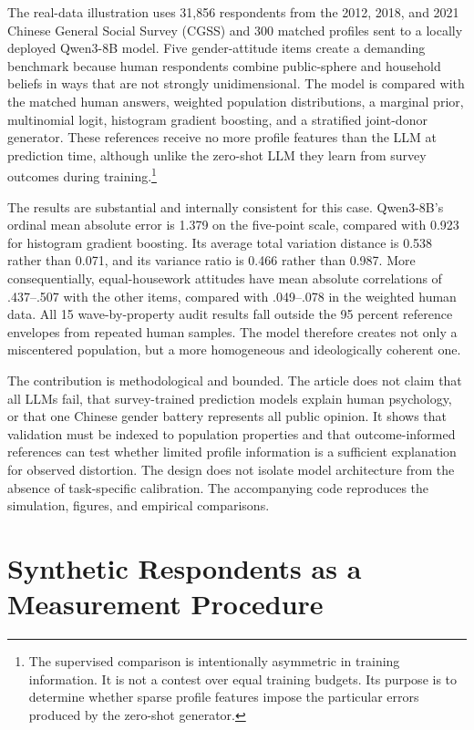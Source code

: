 \documentclass[10pt,twocolumn]{article}
\newcommand{\CGSS}{CGSS\xspace}
\begin{document}
The real-data illustration uses 31,856 respondents from the 2012, 2018, and 2021 Chinese General
Social Survey (\CGSS) and 300 matched profiles sent to a locally deployed Qwen3-8B model. Five
gender-attitude items create a demanding benchmark because human respondents combine public-sphere
and household beliefs in ways that are not strongly unidimensional. The model is compared with the
matched human answers, weighted population distributions, a marginal prior, multinomial logit,
histogram gradient boosting, and a stratified joint-donor generator. These references receive no
more profile features than the LLM at prediction time, although unlike the zero-shot LLM they learn
from survey outcomes during training.\footnote{The supervised comparison is intentionally asymmetric in training information.
It is not a contest over equal training budgets. Its purpose is to determine whether sparse profile
features impose the particular errors produced by the zero-shot generator.}

The results are substantial and internally consistent for this case. Qwen3-8B's ordinal mean
absolute error is 1.379 on the
five-point scale, compared with 0.923 for histogram gradient boosting. Its average total variation
distance is 0.538 rather than 0.071, and its variance ratio is 0.466 rather than 0.987. More
consequentially, equal-housework attitudes have mean absolute correlations of .437--.507 with the
other items, compared with .049--.078 in the weighted human data. All 15 wave-by-property audit
results fall outside the 95 percent reference envelopes from repeated human samples. The model
therefore creates not only a miscentered population, but a more homogeneous and ideologically
coherent one.

The contribution is methodological and bounded. The article does not claim that all LLMs fail, that
survey-trained prediction models explain human psychology, or that one Chinese gender battery
represents all public opinion. It shows that validation must be indexed to population properties and
that outcome-informed references can test whether limited profile information is a sufficient
explanation for observed distortion. The design does not isolate model architecture from the
absence of task-specific calibration. The accompanying code reproduces the simulation, figures, and
empirical comparisons.

\section{Synthetic Respondents as a Measurement Procedure}
\end{document}
